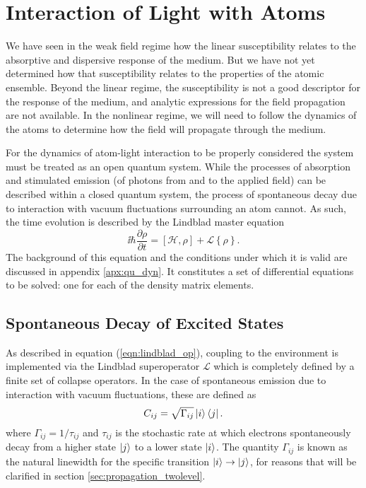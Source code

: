 \section{Interaction of Light with Atoms}
  \label{sec:propagation_ali}

  We have seen in the weak field regime how the linear susceptibility relates to
  the absorptive and dispersive response of the medium. But we have not yet
  determined how that susceptibility relates to the properties of the atomic
  ensemble. Beyond the linear regime, the susceptibility is not a good
  descriptor for the response of the medium, and analytic expressions for the
  field propagation are not available. In the nonlinear regime, we will need to
  follow the dynamics of the atoms to determine how the field will propagate
  through the medium.

  For the dynamics of atom-light interaction to be properly considered the
  system must be treated as an open quantum system. While the processes of
  absorption and stimulated emission (of photons from and to the applied field)
  can be described within a closed quantum system, the process of spontaneous
  decay due to interaction with vacuum fluctuations surrounding an atom cannot.
  As such, the time evolution is described by the Lindblad master equation
    \begin{equation}\label{eqn:lindblad}
      \ii \hbar \frac{\partial \rho}{\partial t} = [\mathcal{H}, \rho] + 
        \mathcal{L}\left\{ \rho \right\}.
    \end{equation}
  The background of this equation and the conditions under which it is valid are
  discussed in appendix \ref{apx:qu_dyn}. It constitutes a set of differential
  equations to be solved: one for each of the density matrix elements.

  \subsection{Spontaneous Decay of Excited States}

    As described in equation (\ref{eqn:lindblad_op}), coupling to the
    environment is implemented via the Lindblad superoperator $\mathcal{L}$
    which is completely defined by a finite set of collapse operators. In the
    case of spontaneous emission due to interaction with vacuum fluctuations,
    these are defined as
    \begin{equation}
      C_{ij} = \sqrt{\Gamma_{ij}} \Ket{i} \Bra{j}.
    \end{equation}
    where $\Gamma_{ij} = 1/\tau_{ij}$ and $\tau_{ij}$ is the stochastic rate at
    which electrons spontaneously decay from a higher state $\Ket{j}$ to a lower
    state $\Ket{i}$. The quantity $\Gamma_{ij}$ is known as the natural
    linewidth for the specific transition $\Ket{i} \rightarrow \Ket{j}$, for
    reasons that will be clarified in section \ref{sec:propagation_twolevel}.


